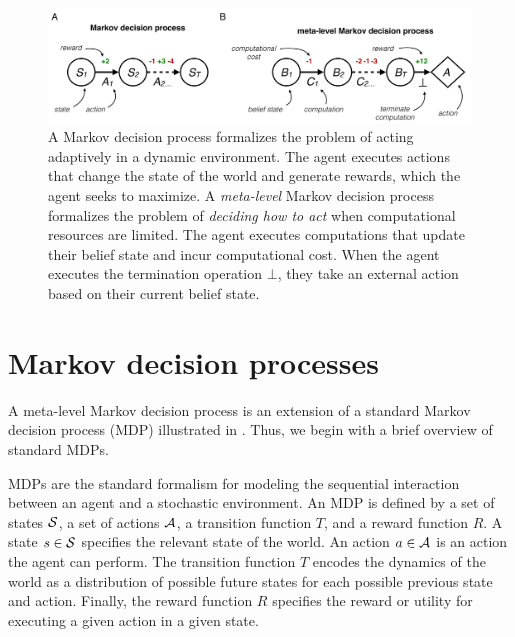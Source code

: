 

\begin{figure}
  \includegraphics[width=\textwidth]{figs/metamdp.pdf}
  \caption{
   A Markov decision process formalizes the problem of acting adaptively in a dynamic environment. The agent executes actions that change the state of the world and generate rewards, which the agent seeks to maximize.
   A \emph{meta-level} Markov decision process formalizes the problem of \emph{deciding how to act} when computational resources are limited. The agent executes computations that update their belief state and incur computational cost. When the agent executes the termination operation $\bot$, they take an external action based on their current belief state.}
  \label{fig:metamdp-diagram}
\end{figure}


\section{Markov decision processes}

A meta-level Markov decision process is an extension of a standard Markov decision process (MDP) illustrated in . Thus, we begin with a brief overview of standard MDPs.

MDPs are the standard formalism for modeling the sequential interaction between an agent and a stochastic environment. An MDP is defined by a set of states $\S$, a set of actions $\A$, a transition function $T$, and a reward function $R$. A state $s \in \S$ specifies the relevant state of the world. An action $a \in \A$ is an action the agent can perform. The transition function $T$ encodes the dynamics of the world as a distribution of possible future states for each possible previous state and action. Finally, the reward function $R$ specifies the reward or utility for executing a given action in a given state.


